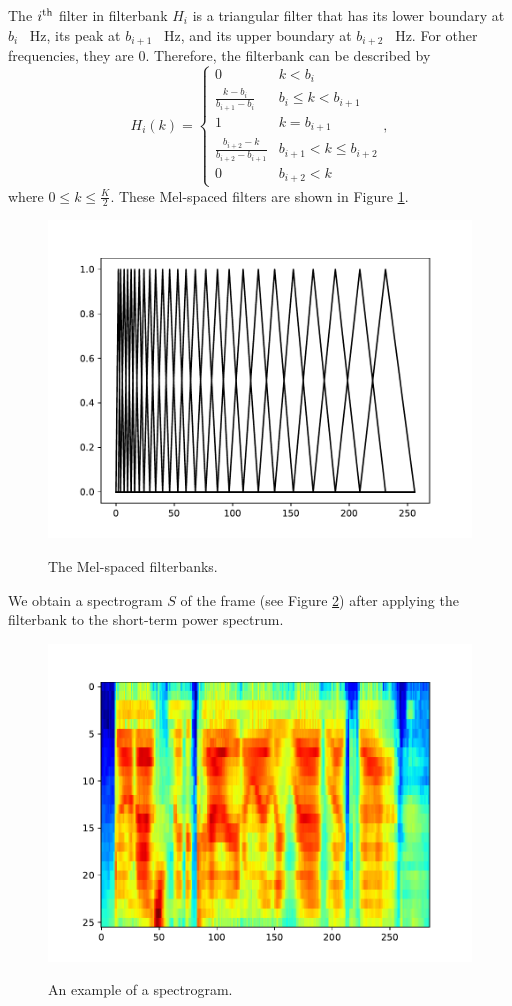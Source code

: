			The $i\textsuperscript{th}$ filter in filterbank $H_i$ is a triangular filter that has its lower boundary at $b_{i}$ \SI{}{\Hz}, its peak at $b_{i+1}$ \SI{}{\Hz}, and its upper boundary at $b_{i+2}$ \SI{}{\Hz}.
			For other frequencies, they are 0.
			Therefore, the filterbank can be described by
			\begin{equation}
				H_i(k) = \begin{cases}
					0 & k<b_i\\
					\frac{k-b_i}{b_{i+1}-b_i} & b_i\leq k < b_{i+1} \\
					1 & k = b_{i+1} \\
					\frac{b_{i+2} - k}{b_{i+2}-b_{i+1}} & b_{i+1} < k \leq b_{i+2}\\
					0 & b_{i+2} < k
				\end{cases},
			\end{equation}
			where $0 \leq k \leq \frac{K}{2}$.
			These Mel-spaced filters are shown in Figure \ref{fig:filterbank}.
			\begin{figure}[ht]
				\centering
			    \includegraphics[width=.45\linewidth]{gfx/fbanks}
			    \label{fig:filterbank}
			    \caption{The Mel-spaced filterbanks.}
			\end{figure}

			We obtain a spectrogram $S$ of the frame (see \eg Figure \ref{fig:spectrogram}) after applying the filterbank to the short-term power spectrum.

			\begin{figure}[ht]
				\centering
			    \includegraphics[width=.45\linewidth]{gfx/spectrogram}
			    \label{fig:spectrogram}
			    \caption{An example of a spectrogram.}
			\end{figure}

